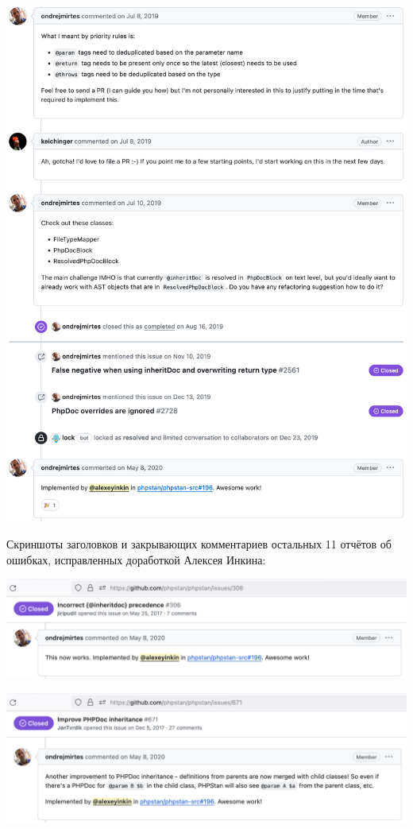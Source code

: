 \Continuing
\begin{center}
    \includegraphics[width=37em]{issue-2281-full-p3}
\end{center}
\pagebreak

Скриншоты заголовков и закрывающих комментариев остальных 11 отчётов об ошибках,
исправленных доработкой Алексея Инкина:

\includegraphics[width=\textwidth]{issue-306}

\includegraphics[width=\textwidth]{issue-671}

